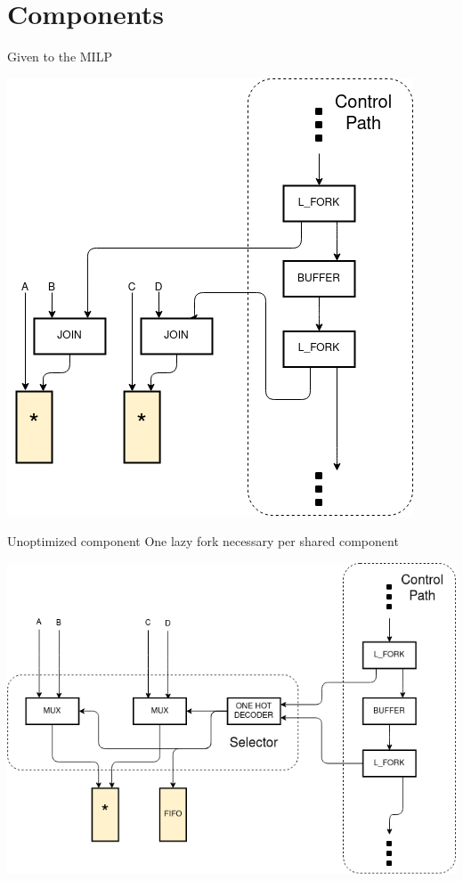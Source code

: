 \documentclass{beamer}
\begin{document}
\section{Components}
\begin{frame}{Given to the MILP}
\begin{center}
\includegraphics[scale=0.4]{given_to_milp(1).png}
\end{center}
\end{frame}

\begin{frame}{Unoptimized component}
One lazy fork necessary per shared component
\begin{center}
\includegraphics[scale=0.4]{simple_selector.png}
\end{center}
\end{frame}
\end{document}
